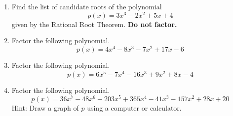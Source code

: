 \documentclass{article}
\begin{document}
\ActivityTitle[class={College Algebra}, number={4}, name={Polynomials 2}]

\begin{enumerate}
\item Find the list of candidate roots of the polynomial \[ p(x) = 3x^3 - 2x^2 + 5x + 4 \] given by the Rational Root Theorem. \textbf{Do not factor.}

   \vspace{3cm}

\item Factor the following polynomial. \[ p(x) = 4x^4 - 8x^3 - 7x^2 + 17x - 6 \]

   \vspace{7cm}

\newpage

\item Factor the following polynomial. \[ p(x) = 6x^5 - 7x^4 - 16x^3 + 9x^2 + 8x - 4 \]

   \vspace{7cm}

\newpage

\item Factor the following polynomial. \[ p(x) = 36x^7 - 48x^6 - 203x^5 + 365x^4 - 41x^3 - 157x^2 + 28x + 20 \] Hint: Draw a graph of $p$ using a computer or calculator.

   \vspace{7cm}
\end{enumerate}
\end{document}
